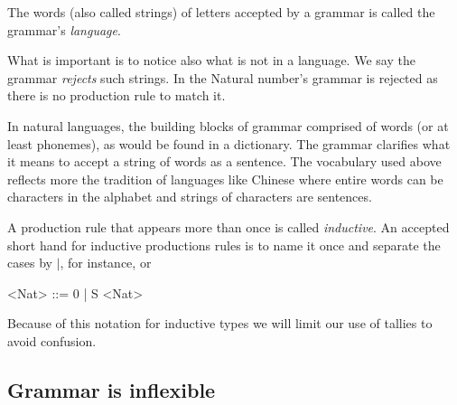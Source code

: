 
\begin{definition}
    The words (also called strings) of letters accepted by a grammar is called the grammar's \emph{language}.
\end{definition}

What is important is to notice also what is not in a language.  We 
say the grammar \emph{rejects} such strings.  In the Natural 
number's grammar  is rejected as there is no production 
rule to match it.

\begin{remark}
    In natural languages, the building blocks of grammar 
    comprised of words (or at least phonemes), as would be found in a dictionary.  The grammar clarifies what it means to accept a string of 
    words as a sentence. The vocabulary used above reflects more the 
    tradition of languages like Chinese where entire words can be characters 
    in the alphabet and strings of characters are sentences.
\end{remark}

\begin{definition}
A production rule that appears more than once is called \emph{inductive}.
An accepted short hand for inductive productions rules is to name it once 
and separate the cases by $\mid$, for instance,
 or 
\begin{center}
\begin{gcode}[]
<Nat> ::= 0 
        | S <Nat>
\end{gcode}
\end{center}
\end{definition}


Because of this notation for inductive types we will limit our use of tallies
to avoid confusion.

    
\subsection{Grammar is inflexible}

